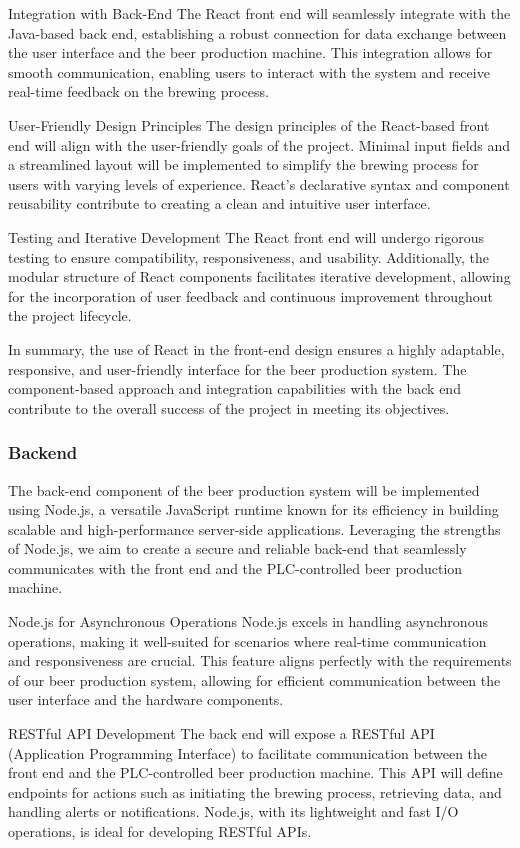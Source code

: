 Integration with Back-End
The React front end will seamlessly integrate with the Java-based back end, establishing a robust connection for data exchange between the user interface and the beer production machine. This integration allows for smooth communication, enabling users to interact with the system and receive real-time feedback on the brewing process.

User-Friendly Design Principles
The design principles of the React-based front end will align with the user-friendly goals of the project. Minimal input fields and a streamlined layout will be implemented to simplify the brewing process for users with varying levels of experience. React's declarative syntax and component reusability contribute to creating a clean and intuitive user interface.

Testing and Iterative Development
The React front end will undergo rigorous testing to ensure compatibility, responsiveness, and usability. Additionally, the modular structure of React components facilitates iterative development, allowing for the incorporation of user feedback and continuous improvement throughout the project lifecycle.

In summary, the use of React in the front-end design ensures a highly adaptable, responsive, and user-friendly interface for the beer production system. The component-based approach and integration capabilities with the back end contribute to the overall success of the project in meeting its objectives.

\subsubsection{Backend}
The back-end component of the beer production system will be implemented using Node.js, a versatile JavaScript runtime known for its efficiency in building scalable and high-performance server-side applications. Leveraging the strengths of Node.js, we aim to create a secure and reliable back-end that seamlessly communicates with the front end and the PLC-controlled beer production machine.

Node.js for Asynchronous Operations
Node.js excels in handling asynchronous operations, making it well-suited for scenarios where real-time communication and responsiveness are crucial. This feature aligns perfectly with the requirements of our beer production system, allowing for efficient communication between the user interface and the hardware components.

RESTful API Development
The back end will expose a RESTful API (Application Programming Interface) to facilitate communication between the front end and the PLC-controlled beer production machine. This API will define endpoints for actions such as initiating the brewing process, retrieving data, and handling alerts or notifications. Node.js, with its lightweight and fast I/O operations, is ideal for developing RESTful APIs.

